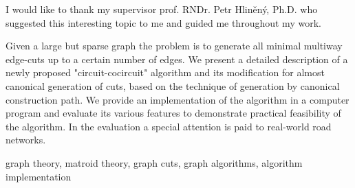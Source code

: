 




  \FrontMatter                    %
    \ThesisTitlePage                %
    \begin{ThesisDeclaration}       %
      \DeclarationText
      \AdvisorName
    \end{ThesisDeclaration}
    \begin{ThesisThanks}            %
      I would like to thank my supervisor prof. RNDr. Petr Hliněný, Ph.D. who suggested this interesting topic to me and guided me throughout my work.


    \end{ThesisThanks}
    \begin{ThesisAbstract}          %

Given a large but sparse graph the problem is to generate all minimal multiway edge-cuts up to a certain number of edges. We present a detailed description of a newly proposed "circuit-cocircuit" algorithm and its modification for almost canonical generation of cuts, based on the technique of generation by canonical construction path. We provide an implementation of the algorithm in a computer program and evaluate its various features to demonstrate practical feasibility of the algorithm. In the evaluation a special attention is paid to real-world road networks.

	\end{ThesisAbstract}
    \begin{ThesisKeyWords}          %
      graph theory, matroid theory, graph cuts, graph algorithms, algorithm implementation
    \end{ThesisKeyWords}
    \tableofcontents                %

\MainMatter                     %









\printbibliography


